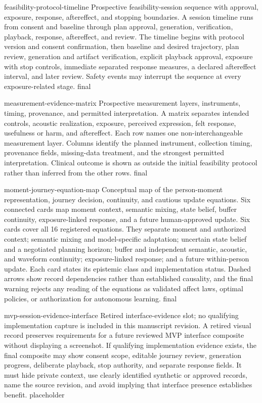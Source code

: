 \AntidoteDeclareVisualText
  {feasibility-protocol-timeline}
  {Prospective feasibility-session sequence with approval, exposure, response, aftereffect, and stopping boundaries.}
  {A session timeline runs from consent and baseline through plan approval, generation, verification, playback, response, aftereffect, and review.}
  {The timeline begins with protocol version and consent confirmation, then baseline and desired trajectory, plan review, generation and artifact verification, explicit playback approval, exposure with stop controls, immediate separated response measures, a declared aftereffect interval, and later review. Safety events may interrupt the sequence at every exposure-related stage.}
  {final}

\AntidoteDeclareVisualText
  {measurement-evidence-matrix}
  {Prospective measurement layers, instruments, timing, provenance, and permitted interpretation.}
  {A matrix separates intended controls, acoustic realization, exposure, perceived expression, felt response, usefulness or harm, and aftereffect.}
  {Each row names one non-interchangeable measurement layer. Columns identify the planned instrument, collection timing, provenance fields, missing-data treatment, and the strongest permitted interpretation. Clinical outcome is shown as outside the initial feasibility protocol rather than inferred from the other rows.}
  {final}

\AntidoteDeclareVisualText
  {moment-journey-equation-map}
  {Conceptual map of the person-moment representation, journey decision, continuity, and cautious update equations.}
  {Six connected cards map moment context, semantic mixing, state belief, buffer continuity, exposure-linked response, and a future human-approved update.}
  {Six cards cover all 16 registered equations. They separate moment and authorized context; semantic mixing and model-specific adaptation; uncertain state belief and a negotiated planning horizon; buffer and independent semantic, acoustic, and waveform continuity; exposure-linked response; and a future within-person update. Each card states its epistemic class and implementation status. Dashed arrows show record dependencies rather than established causality, and the final warning rejects any reading of the equations as validated affect laws, optimal policies, or authorization for autonomous learning.}
  {final}

\AntidoteDeclareVisualText
  {mvp-session-evidence-interface}
  {Retired interface-evidence slot; no qualifying implementation capture is included in this manuscript revision.}
  {A retired visual record preserves requirements for a future reviewed MVP interface composite without displaying a screenshot.}
  {If qualifying implementation evidence exists, the final composite may show consent scope, editable journey review, generation progress, deliberate playback, stop authority, and separate response fields. It must hide private context, use clearly identified synthetic or approved records, name the source revision, and avoid implying that interface presence establishes benefit.}
  {placeholder}

